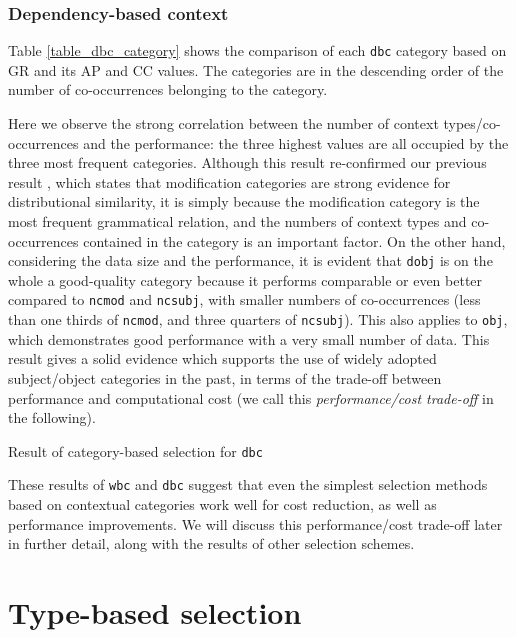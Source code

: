 \documentclass[english]{jnlp_1.4}
\begin{document}
\subsubsection{Dependency-based context}

Table \ref{table_dbc_category} shows the comparison of each {\tt dbc}
category based on GR and its AP and CC values. The categories are in
the descending order of the number of co-occurrences belonging to the
category. 

Here we observe the strong correlation between the number of context
types/co-occurrences and the performance: the three highest values are
all occupied by the three most frequent categories. Although this
result re-confirmed our previous result \cite{Hagiwara:06}, which
states that modification categories are strong evidence for
distributional similarity, it is simply because the modification
category is the most frequent grammatical relation, and the numbers of
context types and co-occurrences contained in the category is an
important factor. On the other hand, considering the data size and the
performance, it is evident that {\tt dobj} is on the whole a
good-quality category because it performs comparable or even better
compared to {\tt ncmod} and {\tt ncsubj}, with smaller numbers of
co-occurrences (less than one thirds of {\tt ncmod}, and three
quarters of {\tt ncsubj}). This also applies to {\tt obj}, which
demonstrates good performance with a very small number of data.  This
result gives a solid evidence which supports the use of widely adopted
subject/object categories in the past, in terms of the trade-off
between performance and computational cost (we call this {\em
performance/cost trade-off} in the following).

\begin{table}[t]
\caption{Result of category-based selection for {\tt dbc}}
\label{table_dbc_category}
\begin{center}

\end{center}
\end{table}


These results of {\tt wbc} and {\tt dbc} suggest that even the
simplest selection methods based on contextual categories work well
for cost reduction, as well as performance improvements. We will
discuss this performance/cost trade-off later in further detail, along
with the results of other selection schemes.

\section{Type-based selection}
\end{document}
